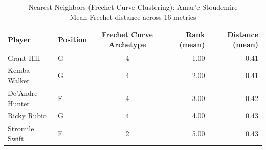 \begin{table}[t]
\caption*{
{\fontsize{20}{25} Nearest Neighbors (Frechet Curve Clustering): Amar'e Stoudemire\fontsize{12}{15}\selectfont } \\ 
{\fontsize{14}{17}\selectfont  Mean Frechet distance across 16 metrics\fontsize{12}{15}\selectfont }
} 
\fontsize{12.0pt}{14.0pt}\selectfont
\begin{tabular*}{\linewidth}{@{\extracolsep{\fill}}llcrr}
\toprule
Player & Position & Frechet Curve Archetype & Rank (mean) & Distance (mean) \\ 
\midrule\addlinespace[2.5pt]
Grant Hill & G & 4 & 1.00 & 0.41 \\ 
Kemba Walker & G & 4 & 2.00 & 0.41 \\ 
De'Andre Hunter & F & 4 & 3.00 & 0.42 \\ 
Ricky Rubio & G & 4 & 4.00 & 0.43 \\ 
Stromile Swift & F & 2 & 5.00 & 0.43 \\ 
\bottomrule
\end{tabular*}
\end{table}

